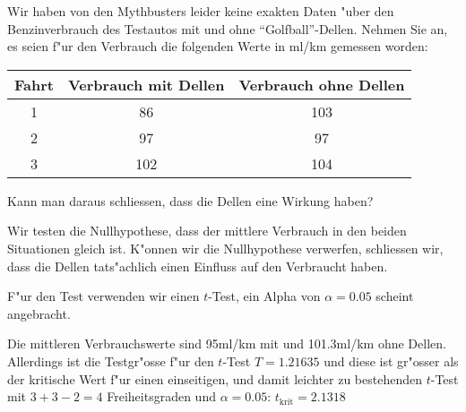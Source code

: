 Wir haben von den Mythbusters leider keine exakten Daten "uber den
Benzinverbrauch des Testautos mit und ohne ``Golfball''-Dellen.
Nehmen Sie an, es seien f"ur den Verbrauch die folgenden Werte in ml/km
gemessen worden:
\begin{center}
\begin{tabular}{ccc}
\hline
Fahrt&Verbrauch mit Dellen&Verbrauch ohne Dellen\\
\hline
1&86&103\\
2&97&97\\
3&102&104\\
\hline
\end{tabular}
\end{center}
Kann man daraus schliessen, dass die Dellen eine Wirkung haben?

\begin{loesung}
Wir testen die Nullhypothese, dass der mittlere Verbrauch in den
beiden Situationen gleich ist.
K"onnen wir die Nullhypothese verwerfen, schliessen wir, dass die
Dellen tats"achlich einen Einfluss auf den Verbraucht haben.

F"ur den Test verwenden wir einen $t$-Test, ein Alpha von
$\alpha=0.05$ scheint angebracht.

Die mittleren Verbrauchswerte sind 95ml/km mit und 101.3ml/km ohne
Dellen.
Allerdings ist die Testgr"osse f"ur den $t$-Test
$T=1.21635$ und diese ist gr"osser als der kritische Wert f"ur
einen einseitigen, und damit leichter zu bestehenden $t$-Test mit
$3+3-2=4$ Freiheitsgraden und
$\alpha=0.05$: $t_{\text{krit}}=2.1318$
\end{loesung}

